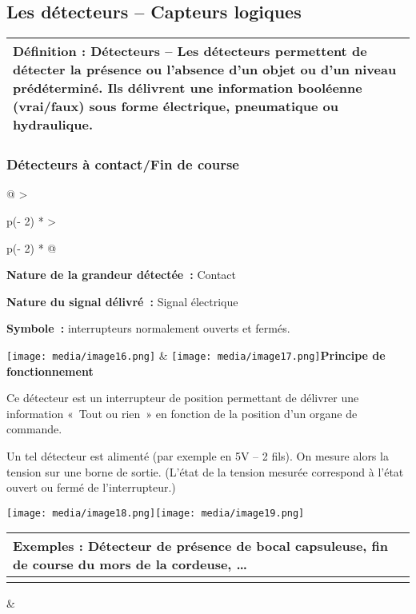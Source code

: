 \documentclass[
]{article}
\begin{document}
\hypertarget{les-duxe9tecteurs-capteurs-logiques}{%
\subsection{Les détecteurs -- Capteurs
logiques}\label{les-duxe9tecteurs-capteurs-logiques}}

\begin{longtable}[]{@{}l@{}}
\toprule
\endhead
\textbf{Définition : Détecteurs --} Les détecteurs permettent de
détecter la présence ou l'absence d'un objet ou d'un niveau
prédéterminé. Ils délivrent une information booléenne (vrai/faux) sous
forme électrique, pneumatique ou hydraulique. \\
\bottomrule
\end{longtable}

\hypertarget{duxe9tecteurs-uxe0-contactfin-de-course}{%
\subsubsection{Détecteurs à contact/Fin de
course}\label{duxe9tecteurs-uxe0-contactfin-de-course}}

\begin{longtable}[]{@{}
  >{\raggedright\arraybackslash}p{(\columnwidth - 2\tabcolsep) * }
  >{\raggedright\arraybackslash}p{(\columnwidth - 2\tabcolsep) * }@{}}
\toprule
\textbf{Nature de la grandeur détectée~:} Contact

\textbf{Nature du signal délivré~:} Signal électrique

\textbf{Symbole~:} interrupteurs normalement ouverts et fermés.

\texttt{[image: media/image16.png]} &
\texttt{[image: media/image17.png]}\textbf{Principe
de fonctionnement}

Ce détecteur est un interrupteur de position permettant de délivrer une
information «~Tout ou rien~» en fonction de la position d'un organe de
commande.

Un tel détecteur est alimenté (par exemple en 5V -- 2 fils). On mesure
alors la tension sur une borne de sortie. (L'état de la tension mesurée
correspond à l'état ouvert ou fermé de l'interrupteur.) \\
\midrule
\endhead
\begin{minipage}[t]{\linewidth}\raggedright
\texttt{[image: media/image18.png]}\texttt{[image: media/image19.png]}

\begin{longtable}[]{@{}l@{}}
\toprule
\textbf{Exemples :} Détecteur de présence de bocal capsuleuse, fin de
course du mors de la cordeuse, \ldots{} \\
\midrule
\endhead
 \\
\bottomrule
\end{longtable}
\end{minipage} & \\
\bottomrule
\end{longtable}
\end{document}
